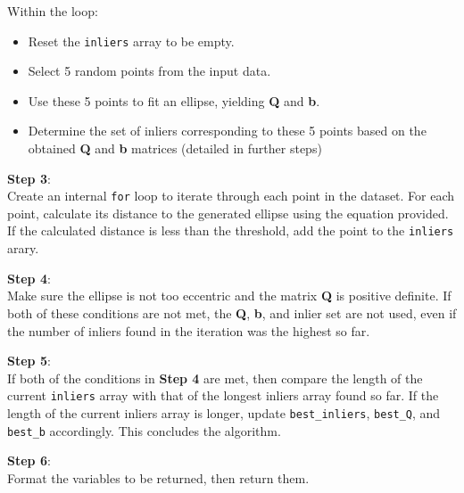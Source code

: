 \begin{enumerate}[a.)]
 Within the loop:
 \begin{itemize}
     \item Reset the \texttt{inliers} array to be empty.
     \item Select 5 random points from the input data.
     \item Use these 5 points to fit an ellipse, yielding \textbf{Q} and \textbf{b}.
     \item Determine the set of inliers corresponding to these 5 points based on the obtained \textbf{Q} and \textbf{b} matrices (detailed in further steps)
 \end{itemize}
 \textbf{Step 3}: \\
 Create an internal \texttt{for} loop to iterate through each point in the dataset. For each point, calculate its distance to the generated ellipse using the equation provided. If the calculated distance is less than the threshold, add the point to the \texttt{inliers} arary.
 
 \textbf{Step 4}: \\
 Make sure the ellipse is not too eccentric and the matrix \textbf{Q} is positive definite. If both of these conditions are not met, the \textbf{Q}, \textbf{b}, and inlier set are not used, even if the number of inliers found in the iteration was the highest so far.
 
 \textbf{Step 5}: \\
 If both of the conditions in \textbf{Step 4} are met, then compare the length of the current \texttt{inliers} array with that of the longest inliers array found so far. If the length of the current inliers array is longer, update \texttt{best\_inliers}, \texttt{best\_Q}, and \texttt{best\_b} accordingly. This concludes the algorithm.

 \textbf{Step 6}: \\
 Format the variables to be returned, then return them.


\end{enumerate}
